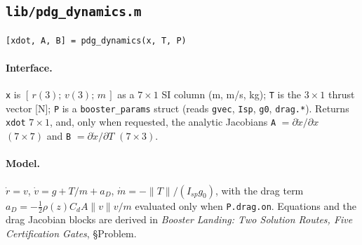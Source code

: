 \documentclass[11pt]{article}
\newcommand{\thenote}{\emph{Booster Landing: Two Solution Routes, Five
Certification Gates}}
\newcommand{\noteS}[1]{\thenote, \S#1}
\begin{document}
\subsection{\texttt{lib/pdg\_dynamics.m}}
\label{sec:mod:dyn}

\begin{verbatim}
[xdot, A, B] = pdg_dynamics(x, T, P)
\end{verbatim}

\paragraph{Interface.}
\texttt{x} is $[\,r(3);\,v(3);\,m\,]$ as a $7\times1$ SI column
(m, m/s, kg); \texttt{T} is the $3\times1$ thrust vector [N]; \texttt{P} is
a \texttt{booster\_params} struct (reads \texttt{gvec}, \texttt{Isp},
\texttt{g0}, \texttt{drag.*}). Returns \texttt{xdot} $7\times1$, and, only
when requested, the analytic Jacobians \texttt{A} $= \partial\dot x/\partial x$
$(7\times7)$ and \texttt{B} $= \partial\dot x/\partial T$ $(7\times3)$.

\paragraph{Model.} $\dot r = v$, $\dot v = g + T/m + a_D$,
$\dot m = -\lVert T\rVert/(I_{sp}g_0)$, with the drag term
$a_D = -\tfrac12\rho(z)C_dA\lVert v\rVert v/m$ evaluated only when
\texttt{P.drag.on}. Equations and the drag Jacobian blocks are derived in
\noteS{Problem}.
\end{document}
